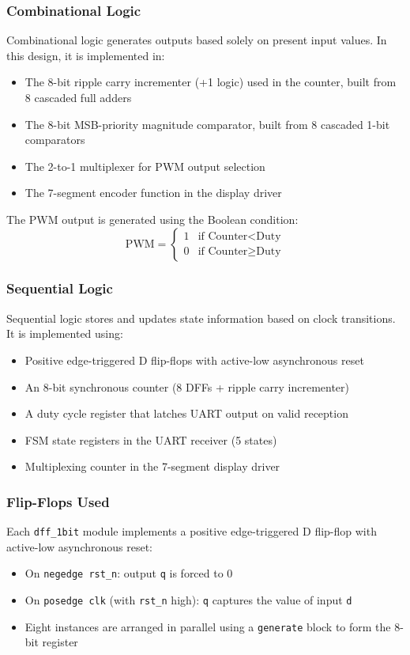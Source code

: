 \documentclass[12pt,a4paper]{article}
\begin{document}
\subsubsection*{Combinational Logic}
Combinational logic generates outputs based solely on present input values. In this design, it is implemented in:
\begin{itemize}
\item The 8-bit ripple carry incrementer (+1 logic) used in the counter, built from 8 cascaded full adders
\item The 8-bit MSB-priority magnitude comparator, built from 8 cascaded 1-bit comparators
\item The 2-to-1 multiplexer for PWM output selection
\item The 7-segment encoder function in the display driver
\end{itemize}

The PWM output is generated using the Boolean condition:
\[
\text{PWM} = \begin{cases}
1 & \text{if Counter} < \text{Duty} \\
0 & \text{if Counter} \geq \text{Duty}
\end{cases}
\]

\subsubsection*{Sequential Logic}
Sequential logic stores and updates state information based on clock transitions. It is implemented using:
\begin{itemize}
\item Positive edge-triggered D flip-flops with active-low asynchronous reset
\item An 8-bit synchronous counter (8 DFFs + ripple carry incrementer)
\item A duty cycle register that latches UART output on valid reception
\item FSM state registers in the UART receiver (5 states)
\item Multiplexing counter in the 7-segment display driver
\end{itemize}

\subsubsection*{Flip-Flops Used}
Each \texttt{dff\_1bit} module implements a positive edge-triggered D flip-flop with active-low asynchronous reset:
\begin{itemize}
\item On \texttt{negedge rst\_n}: output \texttt{q} is forced to 0
\item On \texttt{posedge clk} (with \texttt{rst\_n} high): \texttt{q} captures the value of input \texttt{d}
\item Eight instances are arranged in parallel using a \texttt{generate} block to form the 8-bit register
\end{itemize}
\end{document}
